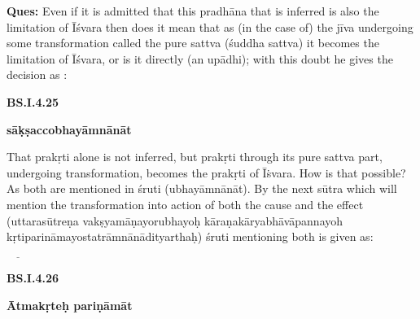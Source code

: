 \textbf{Ques:} Even if it is admitted that this pradhāna that is inferred is also the limitation of Īśvara then does it mean that as (in the case of) the jīva undergoing some transformation called the pure sattva (śuddha sattva) it becomes the limitation of Īśvara, or is it directly (an upādhi); with this doubt he gives the decision as : 

\smallskip

\textbf{}



\smallskip

\textbf{BS.I.4.25}

\textbf{sāḳṣaccobhayāmnānāt}

That prakṛti alone is not inferred, but prakṛti through its pure sattva part, undergoing transformation, becomes the prakṛti of Īṡvara. How is that possible? As both are mentioned in śruti (ubhayāmnānāt). By the next sūtra which will mention the transformation into action of both the cause and the effect (uttarasūtreṇa vakṣyamāṇayorubhayoḥ kāraṇakāryabhāvāpannayoh kṛtiparināmayostatrāmnānādityarthaḥ) śruti mentioning both is given as:

\smallskip

\textbf{}


 $\underline{\qquad}$

\smallskip

\textbf{BS.I.4.26}

\textbf{Ātmakṛteḥ pariṇāmāt}

\vskip 2pt

